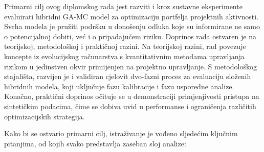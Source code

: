 Primarni cilj ovog diplomskog rada jest razviti i kroz sustavne eksperimente evaluirati hibridni GA-MC model za optimizaciju portfelja projektnih aktivnosti. Svrha modela je pružiti podršku u donošenju odluka koje su informirane ne samo o potencijalnoj dobiti, već i o pripadajućem riziku. Doprinos rada ostvaren je na teorijskoj, metodološkoj i praktičnoj razini. Na teorijskoj razini, rad povezuje koncepte iz evolucijskog računarstva s kvantitativnim metodama upravljanja rizikom u jedinstven okvir primijenjen na projektno upravljanje. S metodološkog stajališta, razvijen je i validiran cjelovit dvo-fazni proces za evaluaciju složenih hibridnih modela, koji uključuje fazu kalibracije i fazu usporedne analize. Konačno, praktični doprinos očituje se u demonstraciji primjenjivosti pristupa na sintetičkim podacima, čime se dobiva uvid u performanse i ograničenja različitih optimizacijskih strategija.

Kako bi se ostvario primarni cilj, istraživanje je vođeno sljedećim ključnim pitanjima, od kojih svako predstavlja zaseban sloj analize:


